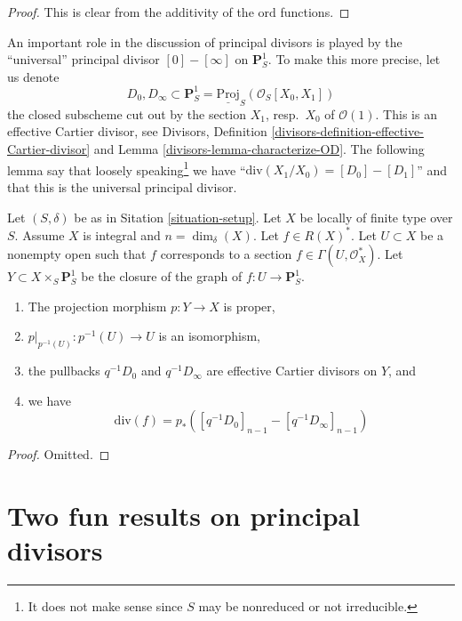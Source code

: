 \begin{proof}
This is clear from the additivity of the $\text{ord}$ functions.
\end{proof}

\noindent
An important role in the discussion of principal divisors
is played by the ``universal'' principal divisor $[0] - [\infty]$
on $\mathbf{P}^1_S$. To make this more precise, let us denote
$$
D_0, D_\infty \subset
\mathbf{P}^1_S = \underline{\text{Proj}}_S(\mathcal{O}_S[X_0, X_1])
$$
the closed subscheme cut out by the section $X_1$, resp.\ $X_0$
of $\mathcal{O}(1)$. This is an effective Cartier divisor, see
Divisors, Definition \ref{divisors-definition-effective-Cartier-divisor}
and Lemma \ref{divisors-lemma-characterize-OD}.
The following lemma say that loosely speaking\footnote{It does not make
sense since $S$ may be nonreduced or not irreducible.} we have
``$\text{div}(X_1/X_0) = [D_0] - [D_1]$'' and that this is the
universal principal divisor.

\begin{lemma}
\label{lemma-rational-function}
Let $(S, \delta)$ be as in Sitation \ref{situation-setup}.
Let $X$ be locally of finite type over $S$. Assume $X$ is
integral and $n = \dim_\delta(X)$. Let $f \in R(X)^*$.
Let $U \subset X$ be a nonempty open such that $f$
corresponds to a section $f \in \Gamma(U, \mathcal{O}_X^*)$.
Let $Y \subset X \times_S \mathbf{P}^1_S$ be the
closure of the graph of $f : U \to \mathbf{P}^1_S$.
\begin{enumerate}
\item The projection morphism $p : Y \to X$ is
proper,
\item $p|_{p^{-1}(U)} : p^{-1}(U) \to U$ is an isomorphism,
\item the pullbacks $q^{-1}D_0$ and $q^{-1}D_\infty$ are effective
Cartier divisors on $Y$, and
\item we have
$$
\text{div}(f) = p_*([q^{-1}D_0]_{n - 1} - [q^{-1}D_\infty]_{n - 1})
$$
\end{enumerate}
\end{lemma}

\begin{proof}
Omitted.
\end{proof}




\section{Two fun results on principal divisors}
\label{section-two-fun}

